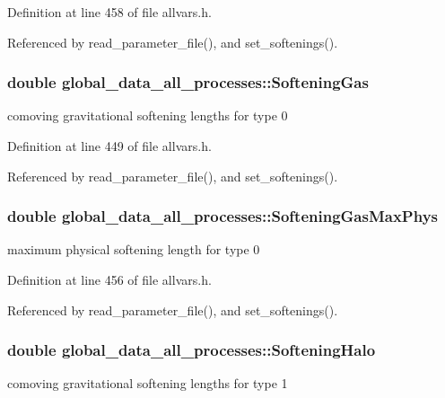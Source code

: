 Definition at line 458 of file allvars.h.



Referenced by read\_\-parameter\_\-file(), and set\_\-softenings().

\hypertarget{structglobal__data__all__processes_a1f85943960c69ff351b48fc2f3933ec2}{
\subsubsection[{SofteningGas}]{\setlength{\rightskip}{0pt plus 5cm}double {\bf global\_\-data\_\-all\_\-processes::SofteningGas}}}
\label{structglobal__data__all__processes_a1f85943960c69ff351b48fc2f3933ec2}
comoving gravitational softening lengths for type 0 

Definition at line 449 of file allvars.h.



Referenced by read\_\-parameter\_\-file(), and set\_\-softenings().

\hypertarget{structglobal__data__all__processes_a1e7634a0c6aa4affa124e095bf32285b}{
\subsubsection[{SofteningGasMaxPhys}]{\setlength{\rightskip}{0pt plus 5cm}double {\bf global\_\-data\_\-all\_\-processes::SofteningGasMaxPhys}}}
\label{structglobal__data__all__processes_a1e7634a0c6aa4affa124e095bf32285b}
maximum physical softening length for type 0 

Definition at line 456 of file allvars.h.



Referenced by read\_\-parameter\_\-file(), and set\_\-softenings().

\hypertarget{structglobal__data__all__processes_a892cb7014ecd4b3910c493755b875b7e}{
\subsubsection[{SofteningHalo}]{\setlength{\rightskip}{0pt plus 5cm}double {\bf global\_\-data\_\-all\_\-processes::SofteningHalo}}}
\label{structglobal__data__all__processes_a892cb7014ecd4b3910c493755b875b7e}
comoving gravitational softening lengths for type 1 

